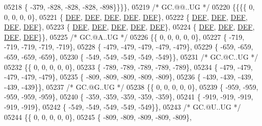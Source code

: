 \begin{DoxyCode}
05218 \{ -379, -828, -828, -828, -898\}\}\}\},
05219 \textcolor{comment}{/* GC.@@..UG */}
05220 \{\{\{\{    0,    0,    0,    0,    0\},
05221 \{  \mbox{\hyperlink{1_88_84__epars_8h_a397419fc12b37ed479c8abb9d444d843}{DEF}},  \mbox{\hyperlink{1_88_84__epars_8h_a397419fc12b37ed479c8abb9d444d843}{DEF}},  \mbox{\hyperlink{1_88_84__epars_8h_a397419fc12b37ed479c8abb9d444d843}{DEF}},  \mbox{\hyperlink{1_88_84__epars_8h_a397419fc12b37ed479c8abb9d444d843}{DEF}},  \mbox{\hyperlink{1_88_84__epars_8h_a397419fc12b37ed479c8abb9d444d843}{DEF}}\},
05222 \{  \mbox{\hyperlink{1_88_84__epars_8h_a397419fc12b37ed479c8abb9d444d843}{DEF}},  \mbox{\hyperlink{1_88_84__epars_8h_a397419fc12b37ed479c8abb9d444d843}{DEF}},  \mbox{\hyperlink{1_88_84__epars_8h_a397419fc12b37ed479c8abb9d444d843}{DEF}},  \mbox{\hyperlink{1_88_84__epars_8h_a397419fc12b37ed479c8abb9d444d843}{DEF}},  \mbox{\hyperlink{1_88_84__epars_8h_a397419fc12b37ed479c8abb9d444d843}{DEF}}\},
05223 \{  \mbox{\hyperlink{1_88_84__epars_8h_a397419fc12b37ed479c8abb9d444d843}{DEF}},  \mbox{\hyperlink{1_88_84__epars_8h_a397419fc12b37ed479c8abb9d444d843}{DEF}},  \mbox{\hyperlink{1_88_84__epars_8h_a397419fc12b37ed479c8abb9d444d843}{DEF}},  \mbox{\hyperlink{1_88_84__epars_8h_a397419fc12b37ed479c8abb9d444d843}{DEF}},  \mbox{\hyperlink{1_88_84__epars_8h_a397419fc12b37ed479c8abb9d444d843}{DEF}}\},
05224 \{  \mbox{\hyperlink{1_88_84__epars_8h_a397419fc12b37ed479c8abb9d444d843}{DEF}},  \mbox{\hyperlink{1_88_84__epars_8h_a397419fc12b37ed479c8abb9d444d843}{DEF}},  \mbox{\hyperlink{1_88_84__epars_8h_a397419fc12b37ed479c8abb9d444d843}{DEF}},  \mbox{\hyperlink{1_88_84__epars_8h_a397419fc12b37ed479c8abb9d444d843}{DEF}},  \mbox{\hyperlink{1_88_84__epars_8h_a397419fc12b37ed479c8abb9d444d843}{DEF}}\}\},
05225 \textcolor{comment}{/* GC.@A..UG */}
05226 \{\{    0,    0,    0,    0,    0\},
05227 \{ -719, -719, -719, -719, -719\},
05228 \{ -479, -479, -479, -479, -479\},
05229 \{ -659, -659, -659, -659, -659\},
05230 \{ -549, -549, -549, -549, -549\}\},
05231 \textcolor{comment}{/* GC.@C..UG */}
05232 \{\{    0,    0,    0,    0,    0\},
05233 \{ -789, -789, -789, -789, -789\},
05234 \{ -479, -479, -479, -479, -479\},
05235 \{ -809, -809, -809, -809, -809\},
05236 \{ -439, -439, -439, -439, -439\}\},
05237 \textcolor{comment}{/* GC.@G..UG */}
05238 \{\{    0,    0,    0,    0,    0\},
05239 \{ -959, -959, -959, -959, -959\},
05240 \{ -359, -359, -359, -359, -359\},
05241 \{ -919, -919, -919, -919, -919\},
05242 \{ -549, -549, -549, -549, -549\}\},
05243 \textcolor{comment}{/* GC.@U..UG */}
05244 \{\{    0,    0,    0,    0,    0\},
05245 \{ -809, -809, -809, -809, -809\},

\end{DoxyCode}
